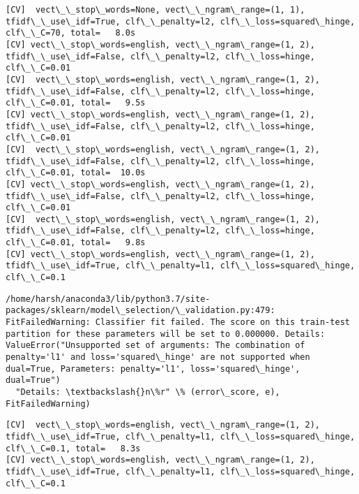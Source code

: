 \documentclass[11pt]{article}
\begin{document}
\begin{Verbatim}[commandchars=\\\{\}]
[CV]  vect\_\_stop\_words=None, vect\_\_ngram\_range=(1, 1), tfidf\_\_use\_idf=True, clf\_\_penalty=l2, clf\_\_loss=squared\_hinge, clf\_\_C=70, total=   8.0s
[CV] vect\_\_stop\_words=english, vect\_\_ngram\_range=(1, 2), tfidf\_\_use\_idf=False, clf\_\_penalty=l2, clf\_\_loss=hinge, clf\_\_C=0.01 
[CV]  vect\_\_stop\_words=english, vect\_\_ngram\_range=(1, 2), tfidf\_\_use\_idf=False, clf\_\_penalty=l2, clf\_\_loss=hinge, clf\_\_C=0.01, total=   9.5s
[CV] vect\_\_stop\_words=english, vect\_\_ngram\_range=(1, 2), tfidf\_\_use\_idf=False, clf\_\_penalty=l2, clf\_\_loss=hinge, clf\_\_C=0.01 
[CV]  vect\_\_stop\_words=english, vect\_\_ngram\_range=(1, 2), tfidf\_\_use\_idf=False, clf\_\_penalty=l2, clf\_\_loss=hinge, clf\_\_C=0.01, total=  10.0s
[CV] vect\_\_stop\_words=english, vect\_\_ngram\_range=(1, 2), tfidf\_\_use\_idf=False, clf\_\_penalty=l2, clf\_\_loss=hinge, clf\_\_C=0.01 
[CV]  vect\_\_stop\_words=english, vect\_\_ngram\_range=(1, 2), tfidf\_\_use\_idf=False, clf\_\_penalty=l2, clf\_\_loss=hinge, clf\_\_C=0.01, total=   9.8s
[CV] vect\_\_stop\_words=english, vect\_\_ngram\_range=(1, 2), tfidf\_\_use\_idf=True, clf\_\_penalty=l1, clf\_\_loss=squared\_hinge, clf\_\_C=0.1 

    \end{Verbatim}

    \begin{Verbatim}[commandchars=\\\{\}]
/home/harsh/anaconda3/lib/python3.7/site-packages/sklearn/model\_selection/\_validation.py:479: FitFailedWarning: Classifier fit failed. The score on this train-test partition for these parameters will be set to 0.000000. Details: 
ValueError("Unsupported set of arguments: The combination of penalty='l1' and loss='squared\_hinge' are not supported when dual=True, Parameters: penalty='l1', loss='squared\_hinge', dual=True")
  "Details: \textbackslash{}n\%r" \% (error\_score, e), FitFailedWarning)

    \end{Verbatim}

    \begin{Verbatim}[commandchars=\\\{\}]
[CV]  vect\_\_stop\_words=english, vect\_\_ngram\_range=(1, 2), tfidf\_\_use\_idf=True, clf\_\_penalty=l1, clf\_\_loss=squared\_hinge, clf\_\_C=0.1, total=   8.3s
[CV] vect\_\_stop\_words=english, vect\_\_ngram\_range=(1, 2), tfidf\_\_use\_idf=True, clf\_\_penalty=l1, clf\_\_loss=squared\_hinge, clf\_\_C=0.1 

    \end{Verbatim}
\end{document}
